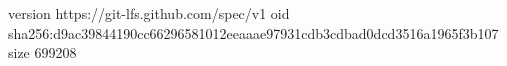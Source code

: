 version https://git-lfs.github.com/spec/v1
oid sha256:d9ac39844190cc66296581012eeaaae97931cdb3cdbad0dcd3516a1965f3b107
size 699208
